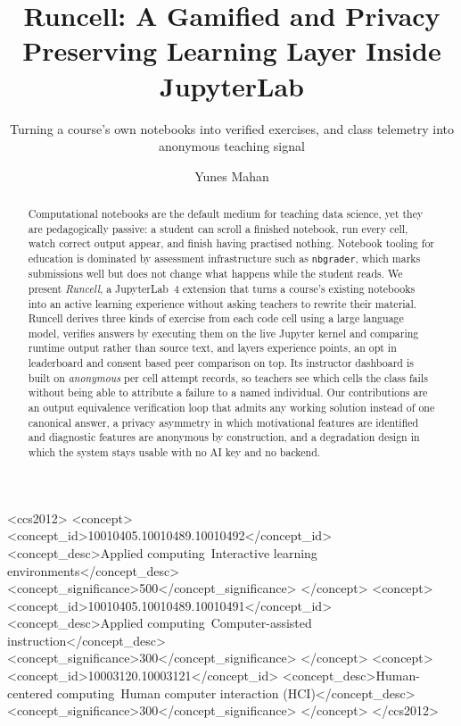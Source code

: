 \documentclass[manuscript]{acmart}
\begin{document}
\title{Runcell: A Gamified and Privacy Preserving Learning Layer Inside
JupyterLab}
\subtitle{Turning a course's own notebooks into verified exercises, and class
telemetry into anonymous teaching signal}

\author{Yunes Mahan}

\begin{abstract}
Computational notebooks are the default medium for teaching data science, yet
they are pedagogically passive: a student can scroll a finished notebook, run
every cell, watch correct output appear, and finish having practised nothing.
Notebook tooling for education is dominated by assessment infrastructure such
as \texttt{nbgrader}, which marks submissions well but does not change what
happens while the student reads. We present \emph{Runcell}, a JupyterLab~4
extension that turns a course's existing notebooks into an active learning
experience without asking teachers to rewrite their material. Runcell derives
three kinds of exercise from each code cell using a large language model,
verifies answers by executing them on the live Jupyter kernel and comparing
runtime output rather than source text, and layers experience points, an opt in
leaderboard and consent based peer comparison on top. Its instructor dashboard
is built on \emph{anonymous} per cell attempt records, so teachers see which
cells the class fails without being able to attribute a failure to a named
individual. Our contributions are an output equivalence verification loop that
admits any working solution instead of one canonical answer, a privacy
asymmetry in which motivational features are identified and diagnostic features
are anonymous by construction, and a degradation design in which the system
stays usable with no AI key and no backend.
\end{abstract}

\begin{CCSXML}
<ccs2012>
 <concept>
  <concept_id>10010405.10010489.10010492</concept_id>
  <concept_desc>Applied computing~Interactive learning environments</concept_desc>
  <concept_significance>500</concept_significance>
 </concept>
 <concept>
  <concept_id>10010405.10010489.10010491</concept_id>
  <concept_desc>Applied computing~Computer-assisted instruction</concept_desc>
  <concept_significance>300</concept_significance>
 </concept>
 <concept>
  <concept_id>10003120.10003121</concept_id>
  <concept_desc>Human-centered computing~Human computer interaction (HCI)</concept_desc>
  <concept_significance>300</concept_significance>
 </concept>
</ccs2012>
\end{CCSXML}
\end{document}
